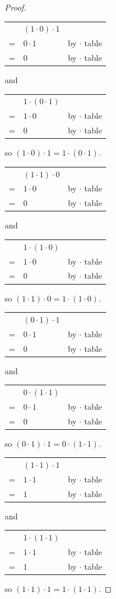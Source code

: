 \documentclass[14pt]{extarticle}
\newcommand{\cy}{\color{cyan}}
\begin{document}
\begin{proof}
\begin{tabular}{cll}
  & \((1 \cdot 0) \cdot 1\) & \\
= & \(0 \cdot 1\) & {\cy by $\cdot$ table} \\
= & \(0\) & {\cy by $\cdot$ table}
\end{tabular}
and
\begin{tabular}{cll}
  & \(1 \cdot (0 \cdot 1)\) & \\
= & \(1 \cdot 0\) & {\cy by $\cdot$ table} \\
= & \(0\) & {\cy by $\cdot$ table}
\end{tabular}
so \((1 \cdot 0) \cdot 1 = 1 \cdot (0 \cdot 1)\).

\begin{tabular}{cll}
  & \((1 \cdot 1) \cdot 0\) & \\
= & \(1 \cdot 0\) & {\cy by $\cdot$ table} \\
= & \(0\) & {\cy by $\cdot$ table}
\end{tabular}
and
\begin{tabular}{cll}
  & \(1 \cdot (1 \cdot 0)\) & \\
= & \(1 \cdot 0\) & {\cy by $\cdot$ table} \\
= & \(0\) & {\cy by $\cdot$ table}
\end{tabular}
so \((1 \cdot 1) \cdot 0 = 1 \cdot (1 \cdot 0)\).

\begin{tabular}{cll}
  & \((0 \cdot 1) \cdot 1\) & \\
= & \(0 \cdot 1\) & {\cy by $\cdot$ table} \\
= & \(0\) & {\cy by $\cdot$ table}
\end{tabular}
and
\begin{tabular}{cll}
  & \(0 \cdot (1 \cdot 1)\) & \\
= & \(0 \cdot 1\) & {\cy by $\cdot$ table} \\
= & \(0\) & {\cy by $\cdot$ table}
\end{tabular}
so \((0 \cdot 1) \cdot 1 = 0 \cdot (1 \cdot 1)\).

\begin{tabular}{cll}
  & \((1 \cdot 1) \cdot 1\) & \\
= & \(1 \cdot 1\) & {\cy by $\cdot$ table} \\
= & \(1\) & {\cy by $\cdot$ table}
\end{tabular}
and
\begin{tabular}{cll}
  & \(1 \cdot (1 \cdot 1)\) & \\
= & \(1 \cdot 1\) & {\cy by $\cdot$ table} \\
= & \(1\) & {\cy by $\cdot$ table}
\end{tabular}
so \((1 \cdot 1) \cdot 1 = 1 \cdot (1 \cdot 1)\).


\end{proof}
\end{document}
